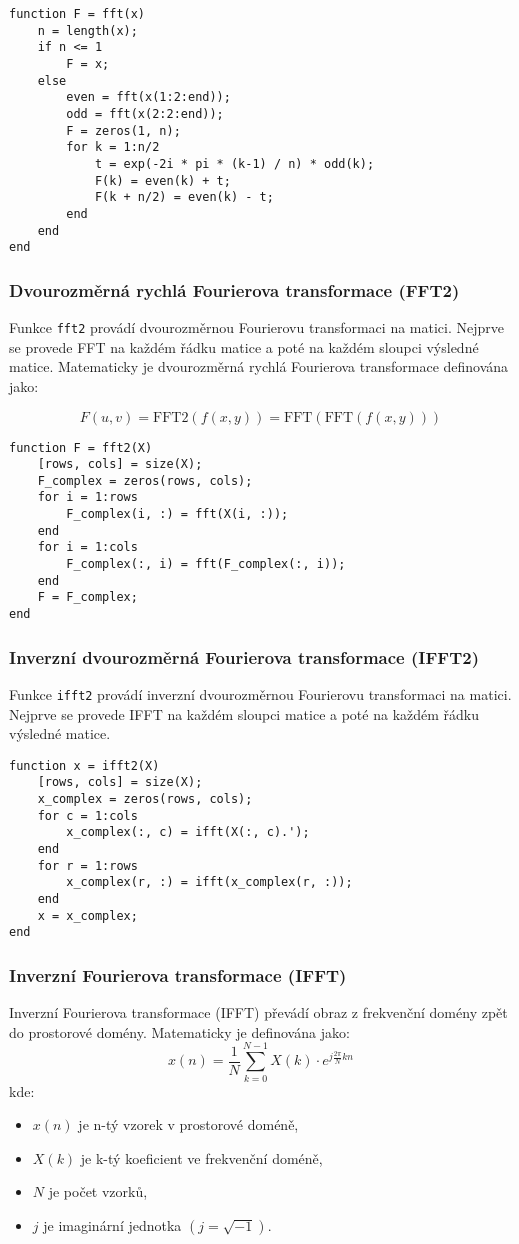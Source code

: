 \begin{verbatim}
function F = fft(x)
    n = length(x);
    if n <= 1
        F = x;
    else
        even = fft(x(1:2:end));
        odd = fft(x(2:2:end));
        F = zeros(1, n);
        for k = 1:n/2
            t = exp(-2i * pi * (k-1) / n) * odd(k);
            F(k) = even(k) + t;
            F(k + n/2) = even(k) - t;
        end
    end
end
\end{verbatim}

\subsubsection{Dvourozměrná rychlá Fourierova transformace (FFT2)}
Funkce \texttt{fft2} provádí dvourozměrnou Fourierovu transformaci na matici. Nejprve se provede FFT na každém řádku matice a poté na každém sloupci výsledné matice. Matematicky je dvourozměrná rychlá Fourierova transformace definována jako:

\[
F(u, v) = \text{FFT2}(f(x, y)) = \text{FFT} \left( \text{FFT}(f(x, y)) \right)
\]

\begin{verbatim}
function F = fft2(X)
    [rows, cols] = size(X);
    F_complex = zeros(rows, cols);
    for i = 1:rows
        F_complex(i, :) = fft(X(i, :));
    end
    for i = 1:cols
        F_complex(:, i) = fft(F_complex(:, i));
    end
    F = F_complex;
end
\end{verbatim}

\subsubsection{Inverzní dvourozměrná Fourierova transformace (IFFT2)}
Funkce \texttt{ifft2} provádí inverzní dvourozměrnou Fourierovu transformaci na matici. Nejprve se provede IFFT na každém sloupci matice a poté na každém řádku výsledné matice.

\begin{verbatim}
function x = ifft2(X)
    [rows, cols] = size(X);
    x_complex = zeros(rows, cols);
    for c = 1:cols
        x_complex(:, c) = ifft(X(:, c).');
    end
    for r = 1:rows
        x_complex(r, :) = ifft(x_complex(r, :));
    end
    x = x_complex;
end
\end{verbatim}

\subsubsection{Inverzní Fourierova transformace (IFFT)}
Inverzní Fourierova transformace (IFFT) převádí obraz z frekvenční domény zpět do prostorové domény. Matematicky je definována jako:
\[
x(n) = \frac{1}{N} \sum_{k=0}^{N-1} X(k) \cdot e^{j \frac{2\pi}{N} kn}
\]
kde:
\begin{itemize}
    \item \( x(n) \) je n-tý vzorek v prostorové doméně,
    \item \( X(k) \) je k-tý koeficient ve frekvenční doméně,
    \item \( N \) je počet vzorků,
    \item \( j \) je imaginární jednotka \((j = \sqrt{-1})\).
\end{itemize}

